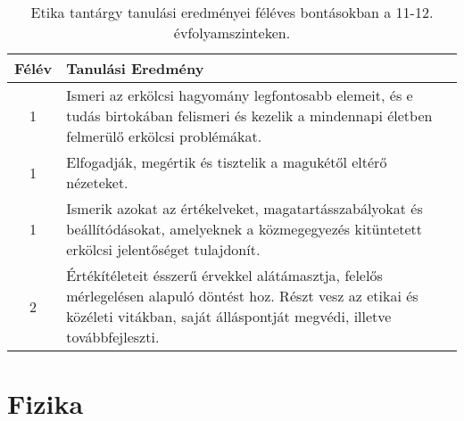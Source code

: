        
           \begin{longtable}{c | p{12cm} }
            \caption[Etika 11-12.]{Etika tantárgy tanulási eredményei féléves bontásokban a 11-12. évfolyamszinteken. }  \\

            \textbf{Félév} & \textbf{Tanulási Eredmény} \\
            \hline
            \endhead
                                
                                          1 &  Ismeri az erkölcsi hagyomány legfontosabb elemeit, és e tudás birtokában felismeri és kezelik a mindennapi életben felmerülő erkölcsi problémákat. \\ \hline
                                          1 &  Elfogadják, megértik és tisztelik a magukétől eltérő nézeteket. \\ \hline
                                          1 &  Ismerik azokat az értékelveket, magatartásszabályokat és beállítódásokat, amelyeknek a közmegegyezés kitüntetett erkölcsi jelentőséget tulajdonít. \\ \hline
                                      
                                
                                          2 &  Értékítéleteit ésszerű érvekkel alátámasztja, felelős mérlegelésen alapuló döntést hoz. Részt vesz az etikai és közéleti vitákban, saját álláspontját megvédi, illetve továbbfejleszti. \\ \hline
                                      
                        \end{longtable}
            \clearpage

        \section{Fizika}

